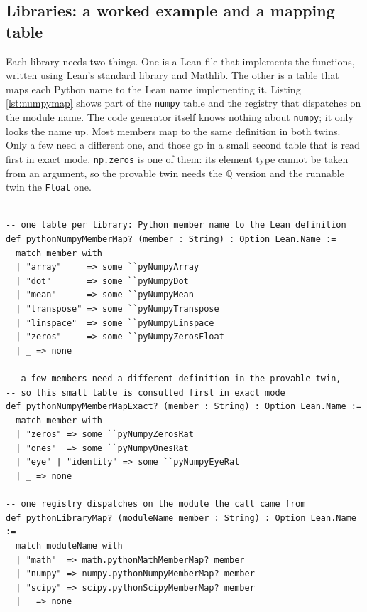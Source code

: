 \documentclass{article}
\newcommand{\code}{\lstinline}
\begin{document}
\subsection{Libraries: a worked example and a mapping table}\label{app:libraries}

Each library needs two things. One is a Lean file that implements the functions, written using Lean's standard library and Mathlib. The other is a table that maps each Python name to the Lean name implementing it. Listing \ref{lst:numpymap} shows part of the \code{numpy} table and the registry that dispatches on the module name. The code generator itself knows nothing about \code{numpy}; it only looks the name up. Most members map to the same definition in both twins. Only a few need a different one, and those go in a small second table that is read first in exact mode. \code{np.zeros} is one of them: its element type cannot be taken from an argument, so the provable twin needs the $\mathbb{Q}$ version and the runnable twin the \code{Float} one.

\begin{lstlisting}[style=lean,caption={Part of the \texttt{numpy} table, the small exact-mode override, and the registry that dispatches on the module name.},label={lst:numpymap}]

-- one table per library: Python member name to the Lean definition
def pythonNumpyMemberMap? (member : String) : Option Lean.Name :=
  match member with
  | "array"     => some ``pyNumpyArray
  | "dot"       => some ``pyNumpyDot
  | "mean"      => some ``pyNumpyMean
  | "transpose" => some ``pyNumpyTranspose
  | "linspace"  => some ``pyNumpyLinspace
  | "zeros"     => some ``pyNumpyZerosFloat
  | _ => none

-- a few members need a different definition in the provable twin,
-- so this small table is consulted first in exact mode
def pythonNumpyMemberMapExact? (member : String) : Option Lean.Name :=
  match member with
  | "zeros" => some ``pyNumpyZerosRat
  | "ones"  => some ``pyNumpyOnesRat
  | "eye" | "identity" => some ``pyNumpyEyeRat
  | _ => none

-- one registry dispatches on the module the call came from
def pythonLibraryMap? (moduleName member : String) : Option Lean.Name :=
  match moduleName with
  | "math"  => math.pythonMathMemberMap? member
  | "numpy" => numpy.pythonNumpyMemberMap? member
  | "scipy" => scipy.pythonScipyMemberMap? member
  | _ => none
\end{lstlisting}
\end{document}

